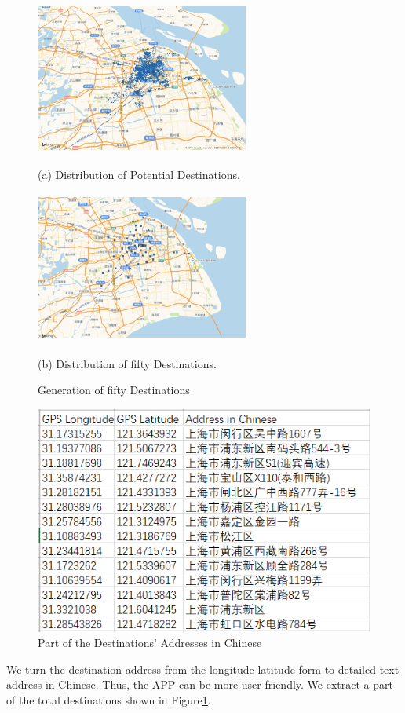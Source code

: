 \documentclass{mcmthesis}
\begin{document}
\begin{figure}[htbp]
    \begin{minipage}{0.44\linewidth}
      \centerline{\includegraphics[height=5cm,width=7cm]{figures/PotentialDetinations.png}}
      \caption*{(a) Distribution of Potential Destinations.}
    \end{minipage}
    \hspace{0.5in}
    \begin{minipage}{0.44\linewidth}
      \centerline{\includegraphics[height=5cm,width=7cm]{figures/fiftydestinations.png}}
      \caption*{(b) Distribution of fifty Destinations.}
    \end{minipage}
    \caption{Generation of fifty Destinations}
\end{figure}

\begin{figure}[htbp]
    \centering
    \includegraphics{figures/AddressinChinese.png}
    \caption{Part of the Destinations' Addresses in Chinese}
    \label{fig:AIC}
\end{figure}
We turn the destination address from the longitude-latitude form to detailed text address in Chinese. Thus, the APP can be more user-friendly. We extract a part of the total destinations shown in Figure\ref{fig:AIC}.
\end{document}
